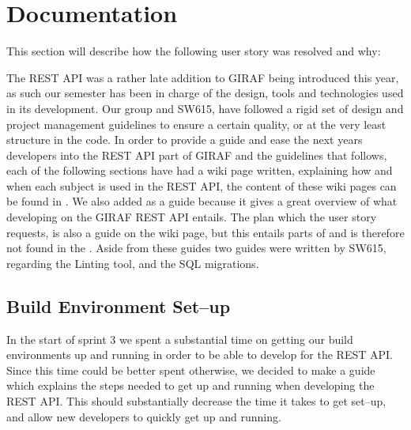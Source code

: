 \section{Documentation}
This section will describe how the following user story was resolved and why:  

The REST API was a rather late addition to GIRAF being introduced this year, as such our semester has been in charge of the design, tools and technologies used in its development.
Our group and SW615, have followed a rigid set of design and project management guidelines to ensure a certain quality, or at the very least structure in the code.
In order to provide a guide and ease the next years developers into the REST API part of GIRAF and the guidelines that follows, each of the following sections have had a wiki page written, explaining how and when each subject is used in the REST API, the content of these wiki pages can be found in .
We also added  as a guide because it gives a great overview of what developing on the GIRAF REST API entails.
The plan which the user story requests, is also a guide on the wiki page, but this entails parts of  and is therefore not found in the .
Aside from these guides two guides were written by SW615, regarding the Linting tool, and the SQL migrations.

\subsection{Build Environment Set--up}
In the start of sprint 3 we spent a substantial time on getting our build environments up and running in order to be able to develop for the REST API.
Since this time could be better spent otherwise, we decided to make a guide which explains the steps needed to get up and running when developing the REST API.
This should substantially decrease the time it takes to get set--up, and allow new developers to quickly get up and running.

